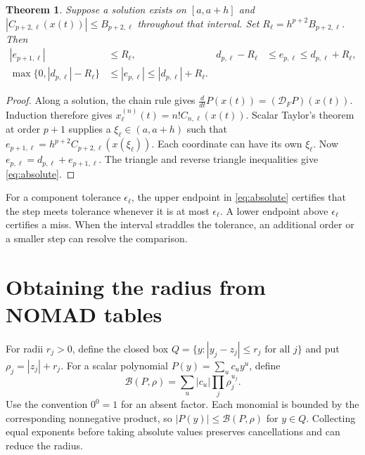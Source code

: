 \documentclass[11pt,letterpaper]{article}
\newcommand{\F}{\mathcal D_F}
\newcommand{\abs}[1]{\left|#1\right|}
\newtheorem{theorem}{Theorem}
\begin{document}
\begin{theorem}\label{th:main}
Suppose a solution exists on \([a,a+h]\) and
\(\abs{C_{p+2,\ell}(x(t))}\le B_{p+2,\ell}\) throughout that interval.
Set \(R_\ell=h^{p+2}B_{p+2,\ell}\). Then
\begin{align}
  |e_{p+1,\ell}| &\le R_\ell, &
  d_{p,\ell}-R_\ell &\le e_{p,\ell}\le d_{p,\ell}+R_\ell,\label{eq:signed}\\
  \max\{0,|d_{p,\ell}|-R_\ell\}
     &\le |e_{p,\ell}| \le |d_{p,\ell}|+R_\ell. &&\label{eq:absolute}
\end{align}
\end{theorem}
\begin{proof}
Along a solution, the chain rule gives
\(\frac{d}{dt}P(x(t))=(\F P)(x(t))\). Induction therefore gives
\(x^{(n)}_\ell(t)=n!C_{n,\ell}(x(t))\). Scalar Taylor's theorem at order
\(p+1\) supplies a \(\xi_\ell\in(a,a+h)\) such that
\(e_{p+1,\ell}=h^{p+2} C_{p+2,\ell}(x(\xi_\ell))\).
Each coordinate can have its own \(\xi_\ell\).
Now \(e_{p,\ell}=d_{p,\ell}+e_{p+1,\ell}\). The triangle and reverse
triangle inequalities give \eqref{eq:absolute}.
\end{proof}

For a component tolerance \(\epsilon_\ell\), the upper endpoint in
\eqref{eq:absolute} certifies that the step meets tolerance whenever it is at
most \(\epsilon_\ell\). A lower endpoint above \(\epsilon_\ell\) certifies a
miss. When the interval straddles the tolerance, an additional order or a
smaller step can resolve the comparison.

\clearpage
\section{Obtaining the radius from NOMAD tables}
For radii \(r_j>0\), define the closed box
\(Q=\{y: |y_j-z_j|\le r_j\text{ for all }j\}\) and put
\(\rho_j=|z_j|+r_j\). For a scalar polynomial
\(P(y)=\sum_u c_u y^u\), define
\begin{equation}\label{eq:maj}
  \mathcal B(P,\rho)=\sum_u |c_u|\prod_j\rho_j^{u_j}.
\end{equation}
Use the convention \(0^0=1\) for an absent factor. Each monomial is
bounded by the corresponding nonnegative product, so
\(\abs{P(y)}\le\mathcal B(P,\rho)\) for \(y\in Q\).
Collecting equal exponents before taking absolute values preserves
cancellations and can reduce the radius.
\end{document}
